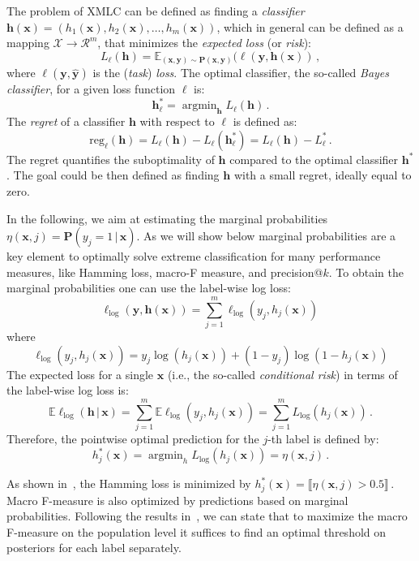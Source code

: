 \documentclass{article}
\renewcommand{\vec}[1]{\boldsymbol{#1}}
\newcommand{\bx}{\vec{x}}
\newcommand{\by}{\vec{y}}
\newcommand{\bh}{\vec{h}}
\newcommand{\calX}{\mathcal{X}}
\newcommand{\calR}{\mathcal{R}}
\newcommand{\prob}{\mathbf{P}}
\newcommand{\reg}{\mathrm{reg}}
\newcommand{\loss}{L}
\newcommand{\assert}[1]{\llbracket #1 \rrbracket}
\newcommand{\given}{\, | \,}
\DeclareMathOperator*{\argmin}{\arg \min}
\begin{document}
The problem of XMLC can be defined as finding a  \emph{classifier} $\bh(\bx) = (h_1(\bx), h_2(\bx),\ldots, h_m(\bx))$, 
which in general can be defined as a mapping $\calX \rightarrow \calR^m$, that minimizes the \emph{expected loss} (or \emph{risk}):  
$$
\loss_\ell(\bh) = \mathbb{E}_{(\bx,\by) \sim \prob(\bx,\by)} (\ell(\by, \bh(\bx))\,,
$$
where $\ell(\by, \hat{\by})$ is the  (\emph{task}) \emph{loss}.
%
The optimal classifier,  the so-called \emph{Bayes classifier},  for a given loss function $\ell$ is:
$$
\bh^*_\ell = \argmin_{\bh}  \loss_\ell(\bh) \,.
$$
The \emph{regret} of a classifier $\bh$ with respect to $\ell$ is defined as:
 $$
\reg_\ell(\bh) = \loss_\ell(\bh) - \loss_\ell(\bh_{\ell}^*) = \loss_\ell(\bh) - \loss_\ell^* \,.
$$
The regret quantifies the suboptimality of $\bh$ compared to the optimal classifier $\bh^*$. The goal could be then defined as finding $\bh$ with a small regret, ideally equal to zero.

In the following, we aim at estimating the marginal probabilities $\eta(\bx,j) = \prob(y_j = 1 \given \bx)$. As we will show below marginal probabilities are a key element to optimally solve extreme classification for many performance measures, like Hamming loss, macro-F measure, and precision@$k$. 
To obtain the marginal probabilities one can use the label-wise log loss:
$$
\ell_{\log}(\by, \bh(\bx))  = \sum_{j=1}^m \ell_{\log}(y_j, h_j(\bx)) \,
$$
where 
$$
\ell_{\log}(y_j,h_j(\bx)) = y_j \log(h_j(\bx)) + (1-y_j) \log(1-h_j(\bx)) 
$$
The expected loss for a single $\bx$ (i.e., the so-called \emph{conditional risk}) in terms of the label-wise log loss is:
$$
\mathbb{E} \ell_{\log}(\bh \given \bx) =  \sum_{j=1}^m \mathbb{E}{\ell_{\log}(y_j, h_j(\bx))} = \sum_{j=1}^m \loss_{\log}(h_j(\bx))\,. %
$$
Therefore, the pointwise optimal prediction for the $j$-th label is defined by:
$$
h_j^*(\bx)  = \argmin_h \loss_{\log}(h_j(\bx)) = \eta(\bx, j) \,.
$$

As shown in~\citep{Dembczynski_et_al_2010c}, the Hamming loss is minimized by 
$
h_j^*(\bx) = \assert{\eta(\bx,j) > 0.5} \,.
$
Macro F-measure is also optimized by predictions based on marginal probabilities. Following the results in~\citep{Ye_et_al_2012,Narasimhan_et_al_2014,Jasinska_et_al_2016, Dembczynski_et_al_2017}, we can state that to maximize the macro F-measure on the population level it suffices to find an optimal threshold on posteriors for each label separately. 
\end{document}
